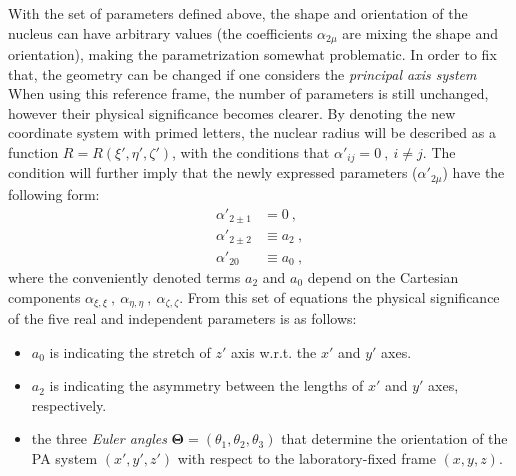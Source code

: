 With the set of parameters defined above, the shape and orientation of the nucleus can have arbitrary values (the coefficients $\alpha_{2\mu}$ are mixing the shape and orientation), making the parametrization somewhat problematic. In order to fix that, the geometry can be changed if one considers the \emph{principal axis system}
When using this reference frame, the number of parameters is still unchanged, however their physical significance becomes clearer. By denoting the new coordinate system with primed letters, the nuclear radius will be described as a function $R=R(\xi',\eta',\zeta')$, with the conditions that $\alpha'_{ij}=0\ ,\ i\neq j$. The condition will further imply that the newly expressed parameters ($\alpha'_{2\mu}$) have the following form:
\begin{align}
    \alpha'_{2 \pm 1}&=0\ , \nonumber \\
    \alpha'_{2 \pm 2}&\equiv a_2\ , \nonumber \\
    \alpha'_{20}&\equiv a_0\ ,
\end{align}
where the conveniently denoted terms $a_2$ and $a_0$ depend on the Cartesian components $\alpha_{\xi,\xi}\ ,\ \alpha_{\eta,\eta}\ ,\ \alpha_{\zeta,\zeta}$. From this set of equations the physical significance of the five real and independent parameters is as follows:
\begin{itemize}
    \item $a_0$ is indicating the stretch of $z'$ axis w.r.t. the $x'$ and $y'$ axes.
    \item $a_2$ is indicating the asymmetry between the lengths of $x'$ and $y'$ axes, respectively.
    \item the three \emph{Euler angles} $\mathbf{\Theta}=(\theta_1,\theta_2,\theta_3)$ that determine the orientation of the PA system $(x',y',z')$ with respect to the laboratory-fixed frame $(x,y,z)$.
\end{itemize}

